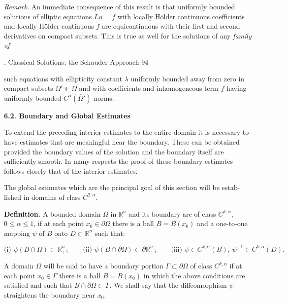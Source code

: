 \noindent \textit{Remark.} An immediate consequence of this result is that uniformly bounded
solutions of elliptic equations $Lu=f$ with locally H\"older continuous coefficients
and locally H\"older continuous $f$ are equicontinuous with their first and second
derivatives on compact subsets. This is true as well for the solutions of any \textit{family of}





. Classical Solutions; the Schauder Approach \hfill 94

\medskip

\noindent such equations with ellipticity constant $\lambda$ uniformly bounded away from zero in
compact subsets $\Omega' \Subset \Omega$ and with coefficients and inhomogeneous term $f$ having
uniformly bounded $C^{\alpha}(\bar{\Omega}')$ norms.

\medskip

\noindent \textbf{6.2. Boundary and Global Estimates}

\medskip

\noindent To extend the preceding interior estimates to the entire domain it is necessary to
have estimates that are meaningful near the boundary. These can be obtained
provided the boundary values of the solution and the boundary itself are sufficiently
smooth. In many respects the proof of these boundary estimates follows closely
that of the interior estimates.

\noindent \hspace*{2em}The global estimates which are the principal goal of this section will be estab-
lished in domains of class $C^{2,\alpha}$.

\medskip

\noindent \textbf{Definition.} A bounded domain $\Omega$ in $\mathbb{R}^n$ and its boundary are of class $C^{k,\alpha}$,
$0\le \alpha \le 1$, if at each point $x_0 \in \partial\Omega$ there is a ball $B=B(x_0)$ and a one-to-one mapping
$\psi$ of $B$ onto $D\subset \mathbb{R}^n$ such that:

\begin{equation*}
\text{(i) } \psi(B\cap \Omega)\subset \mathbb{R}^n_{+}; \qquad
\text{(ii) } \psi(B\cap \partial\Omega)\subset \partial\mathbb{R}^n_{+}; \qquad
\text{(iii) } \psi \in C^{k,\alpha}(B), \ \psi^{-1}\in C^{k,\alpha}(D).
\end{equation*}

\noindent A domain $\Omega$ will be said to have a boundary portion $\Gamma\subset \partial\Omega$ of class $C^{k,\alpha}$ if at each
point $x_0 \in \Gamma$ there is a ball $B=B(x_0)$ in which the above conditions are satisfied
and such that $B\cap \partial\Omega\subset \Gamma$. We shall say that the diffeomorphism $\psi$ straightens the
boundary near $x_0$.

